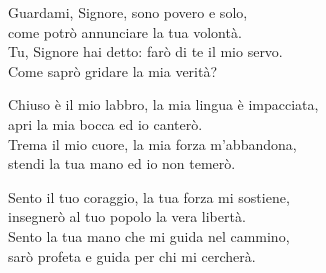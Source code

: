 
\strofa Guardami, Signore, sono povero e solo,\\
come potrò annunciare la tua volontà.\\
Tu, Signore hai detto: farò di te il mio servo.\\
Come saprò gridare la mia verità?

\spazio
  

\spazio

\strofa Chiuso è il mio labbro, la mia lingua è impacciata,\\
apri la mia bocca ed io canterò.\\
Trema il mio cuore, la mia forza m'abbandona,\\
stendi la tua mano ed io non temerò.

\spazio
  

\spazio

\strofa Sento il tuo coraggio, la tua forza mi sostiene,\\
insegnerò al tuo popolo la vera libertà.\\
Sento la tua mano che mi guida nel cammino,\\
sarò profeta e guida per chi mi cercherà.

\spazio
  

